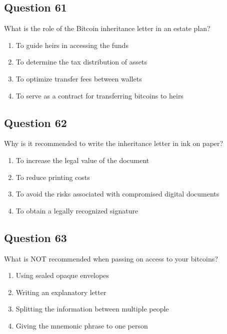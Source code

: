 \documentclass[12pt,a4paper]{article}
\begin{document}
\bigskip


\subsection*{Question 61}
What is the role of the Bitcoin inheritance letter in an estate plan?

\begin{enumerate}[label=\Alph*., leftmargin=*]
\item To guide heirs in accessing the funds
\item To determine the tax distribution of assets
\item To optimize transfer fees between wallets
\item To serve as a contract for transferring bitcoins to heirs
\end{enumerate}

\bigskip


\subsection*{Question 62}
Why is it recommended to write the inheritance letter in ink on paper?

\begin{enumerate}[label=\Alph*., leftmargin=*]
\item To increase the legal value of the document
\item To reduce printing costs
\item To avoid the risks associated with compromised digital documents
\item To obtain a legally recognized signature
\end{enumerate}

\bigskip


\subsection*{Question 63}
What is NOT recommended when passing on access to your bitcoins?

\begin{enumerate}[label=\Alph*., leftmargin=*]
\item Using sealed opaque envelopes
\item Writing an explanatory letter
\item Splitting the information between multiple people
\item Giving the mnemonic phrase to one person
\end{enumerate}
\end{document}

